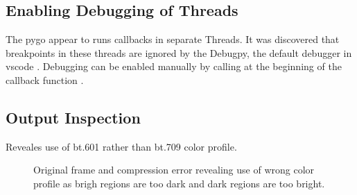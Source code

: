 \subsection{Enabling Debugging of Threads}
The \gls{pygo} appear to runs callbacks in separate Threads.
It was discovered that breakpoints in these threads are ignored by the Debugpy, the default debugger in \gls{vscode} \cite{microsoftDebugpyDebuggerPython2023}\cite{visualstudiocodeDebuggingConfigurationsPython2023}.
Debugging can be enabled manually by calling  at the beginning of the callback function \cite{nadigAnswerDebugNot2019}.


\subsection{Output Inspection}
Reveales use of bt.601 rather than bt.709 color profile.


\begin{figure}[H]
    \centering
    \caption{Original frame and compression error revealing use of wrong color profile as brigh regions are too dark and dark regions are too bright.}
\end{figure}